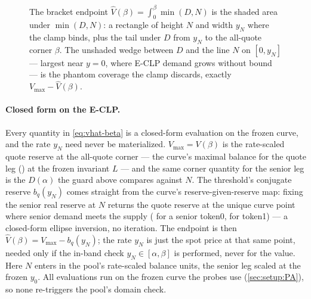 \begin{figure}[!ht]
\centering
{}
\caption{The bracket endpoint $\widehat{V}(\beta) = \int_0^\beta \min(D,N)$
is the shaded area under $\min(D, N)$: a rectangle of height $N$ and width
$y_N$ where the clamp binds, plus the tail under $D$ from $y_N$ to the
all-quote corner $\beta$. The unshaded wedge between $D$ and the line $N$ on
$[0, y_N]$ --- largest near $y = 0$, where E-CLP demand grows without
bound --- is the phantom coverage the clamp discards, exactly
$V_{\max} - \widehat{V}(\beta)$.}
\label{fig:vhat-beta}
\end{figure}

\paragraph{Closed form on the E-CLP.}
Every quantity in \cref{eq:vhat-beta} is a closed-form evaluation on the
frozen curve, and the rate $y_N$ need never be materialized.
$V_{\max} = V(\beta)$ is the rate-scaled quote reserve at the all-quote
corner --- the curve's maximal balance for the quote leg ()
at the frozen invariant $L$ --- and the same corner quantity for the senior
leg is the $D(\alpha)$ the guard above compares against $N$. The threshold's
conjugate reserve $b_q(y_N)$ comes straight from the curve's
reserve-given-reserve map: fixing the senior real reserve at $N$ returns the
quote reserve at the unique curve point where senior demand meets the supply
( for a senior token0,  for token1) --- a
closed-form ellipse inversion, no iteration. The endpoint is then
$\widehat{V}(\beta) = V_{\max} - b_q(y_N)$; the rate $y_N$ is just the spot
price at that same point, needed only if the in-band check
$y_N \in [\alpha, \beta]$ is performed, never for the value. Here $N$ enters
in the pool's rate-scaled balance units, the senior leg scaled at the frozen
$y_0$. All evaluations run on the frozen curve the probes use
(\cref{sec:setup:PA}), so none re-triggers the pool's domain check.

